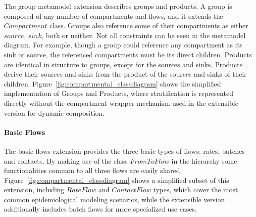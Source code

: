 The group metamodel extension describes groups and products. A group is composed of any number of compartments and flows, and it extends the $Compartment$ class. Groups also reference some of their compartments as either $source$, $sink$, both or neither. Not all constraints can be seen in the metamodel diagram. For example, though a group could reference any compartment as its sink or source, the referenced compartments must be its direct children. Products are identical in structure to groups, except for the sources and sinks. Products derive their sources and sinks from the product of the sources and sinks of their children. Figure~\ref{fig:compartmental_classdiagram} shows the simplified implementation of Groups and Products, where stratification is represented directly without the compartment wrapper mechanism used in the extensible version for dynamic composition.









\paragraph{Basic Flows}
The basic flows extension provides the three basic types of flows: rates, batches and contacts. By making use of the class $FromToFlow$ in the hierarchy some functionalities common to all three flows are easily shared. Figure~\ref{fig:compartmental_classdiagram} shows a simplified subset of this extension, including $RateFlow$ and $ContactFlow$ types, which cover the most common epidemiological modeling scenarios, while the extensible version additionally includes batch flows for more specialized use cases.



